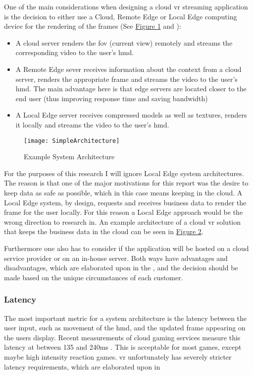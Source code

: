 One of the main considerations when designing a cloud \acrshort{vr} streaming application is the decision to either use a Cloud, Remote Edge or Local Edge computing device for the rendering of the frames (See \hyperref[fig:arch1]{Figure 1} and \cite{wlanvr}):
\begin{itemize}
\item A cloud server renders the \acrfull{fov} (current view) remotely and streams the corresponding video to the user’s \acrfull{hmd}. 
\item A Remote Edge sever receives information about the context from a  cloud server, renders the appropriate frame and streams the video to the user’s \acrshort{hmd}. The main advantage here is that edge servers are located closer to the end user (thus improving response time and saving bandwidth)
\item A Local Edge server receives compressed models as well as textures, renders it locally and streams the video to the user’s \acrshort{hmd}.
\end{itemize} 

\begin{figure}[h!]
\caption{Example System Architecture}
\label{fig:sysarch}
\texttt{[image: SimpleArchitecture]}
\end{figure}

For the purposes of this research I will ignore Local Edge system architectures. The reason is that one of the major motivations for this report was the desire to keep data as safe as possible, which in this case means keeping in the cloud. A Local Edge system, by design, requests and receives business data to render the frame for the user locally. For this reason a Local Edge approach would be the wrong direction to research in. An example architecture of a cloud \acrshort{vr} solution that keeps the business data in the cloud can be seen in \hyperref[fig:sysarch]{Figure 2}.

Furthermore one also has to consider if the application will be hosted on a cloud service provider or on an in-house server. Both ways have advantages and disadvantages, which are elaborated upon in the , and the decision should be made based on the unique circumstances of each customer.

\subsubsection{Latency}
The most important metric for a system architecture is the latency between the user input, such as movement of the \acrshort{hmd}, and the updated frame appearing on the users display. Recent measurements of cloud gaming services measure this latency at between 135 and 240\acrshort{ms} \parencite{lagmeasure}. This is acceptable for most games, except maybe high intensity reaction games. \acrshort{vr} unfortunately has severely stricter latency requirements, which are elaborated upon in 


